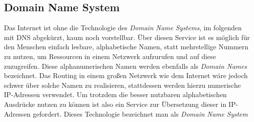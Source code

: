 \hypertarget{domain-name-system}{%
\subsection{Domain Name System}\label{domain-name-system}}

Das Internet ist ohne die Technologie des \emph{Domain Name Systems}, im
folgenden mit DNS abgekürzt, kaum noch vorstellbar. Über diesen Service
ist es möglich für den Menschen einfach lesbare, alphabetische Namen,
statt mehrstellige Nummern zu nutzen, um Ressourcen in einem Netzwerk
aufzurufen und auf diese zuzugreifen. Diese alphanumerischen Namen
werden ebenfalls als \emph{Domain Names} bezeichnet. Das Routing in
einem großen Netzwerk wie dem Internet wäre jedoch schwer über solche
Namen zu realisieren, stattdessen werden hierzu numerische IP-Adressen
verwendet. Um trotzdem die besser nutzbaren alphabetischen Ausdrücke
nutzen zu können ist also ein Service zur Übersetzung dieser in
IP-Adressen gefordert. Dieses Technologie bezeichnet man als
\emph{Domain Name System}
